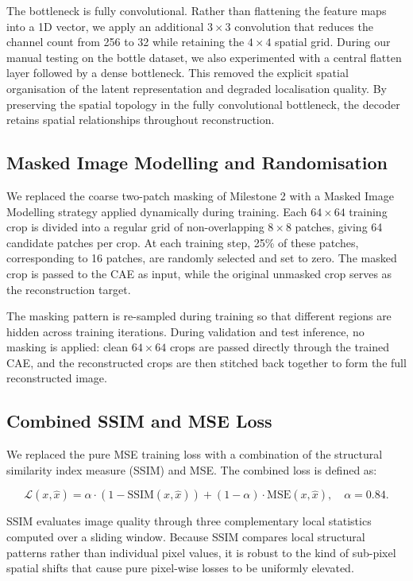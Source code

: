 \documentclass[11pt, a4paper]{article}
\begin{document}
The bottleneck is fully convolutional. Rather than flattening the feature maps into a 1D vector, we apply an additional $3 \times 3$ convolution that reduces the channel count from 256 to 32 while retaining the $4 \times 4$ spatial grid. During our manual testing on the bottle dataset, we also experimented with a central flatten layer followed by a dense bottleneck. This removed the explicit spatial organisation of the latent representation and degraded localisation quality. By preserving the spatial topology in the fully convolutional bottleneck, the decoder retains spatial relationships throughout reconstruction.

\subsection{Masked Image Modelling and Randomisation}
\label{sec:mim}

We replaced the coarse two-patch masking of Milestone 2 with a Masked Image Modelling strategy applied dynamically during training. Each $64 \times 64$ training crop is divided into a regular grid of non-overlapping $8 \times 8$ patches, giving 64 candidate patches per crop. At each training step, 25\% of these patches, corresponding to 16 patches, are randomly selected and set to zero. The masked crop is passed to the CAE as input, while the original unmasked crop serves as the reconstruction target.

The masking pattern is re-sampled during training so that different regions are hidden across training iterations. During validation and test inference, no masking is applied: clean $64 \times 64$ crops are passed directly through the trained CAE, and the reconstructed crops are then stitched back together to form the full reconstructed image.

\subsection{Combined SSIM and MSE Loss}
\label{sec:loss}

We replaced the pure MSE training loss with a combination of the structural similarity index measure (SSIM) \cite{wang2004ssim} and MSE. The combined loss is defined as:

\[
\mathcal{L}(x, \hat{x}) = \alpha \cdot (1 - \text{SSIM}(x, \hat{x})) + (1 - \alpha) \cdot \text{MSE}(x, \hat{x}), \quad \alpha = 0.84.
\]

SSIM evaluates image quality through three complementary local statistics computed over a sliding window. Because SSIM compares local structural patterns rather than individual pixel values, it is robust to the kind of sub-pixel spatial shifts that cause pure pixel-wise losses to be uniformly elevated. 
\end{document}
